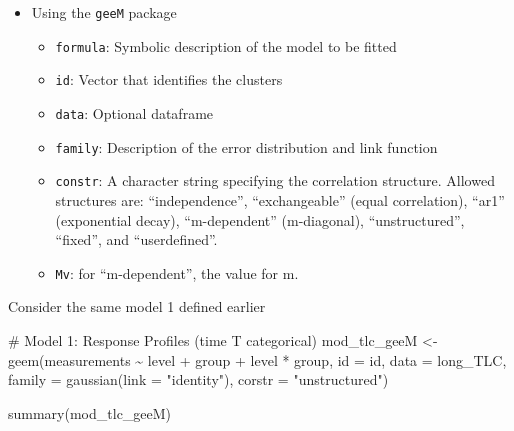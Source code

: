 \documentclass[
  letterpaper,
  DIV=11,
  numbers=noendperiod]{scrreprt}
\newenvironment{Shaded}{\begin{snugshade}}{\end{snugshade}}
\newcommand{\AttributeTok}[1]{\textcolor[rgb]{0.40,0.45,0.13}{#1}}
\newcommand{\CommentTok}[1]{\textcolor[rgb]{0.37,0.37,0.37}{#1}}
\newcommand{\FunctionTok}[1]{\textcolor[rgb]{0.28,0.35,0.67}{#1}}
\newcommand{\NormalTok}[1]{\textcolor[rgb]{0.00,0.23,0.31}{#1}}
\newcommand{\OtherTok}[1]{\textcolor[rgb]{0.00,0.23,0.31}{#1}}
\newcommand{\SpecialCharTok}[1]{\textcolor[rgb]{0.37,0.37,0.37}{#1}}
\newcommand{\StringTok}[1]{\textcolor[rgb]{0.13,0.47,0.30}{#1}}
\providecommand{\tightlist}{%
  \setlength{\itemsep}{0pt}\setlength{\parskip}{0pt}}\usepackage{longtable,booktabs,array}
\begin{document}
\begin{itemize}
\tightlist
\item
  Using the \texttt{geeM} package

  \begin{itemize}
  \tightlist
  \item
    \texttt{formula}: Symbolic description of the model to be fitted
  \item
    \texttt{id}: Vector that identifies the clusters
  \item
    \texttt{data}: Optional dataframe
  \item
    \texttt{family}: Description of the error distribution and link
    function
  \item
    \texttt{constr}: A character string specifying the correlation
    structure. Allowed structures are: ``independence'',
    ``exchangeable'' (equal correlation), ``ar1'' (exponential decay),
    ``m-dependent'' (m-diagonal), ``unstructured'', ``fixed'', and
    ``userdefined''.
  \item
    \texttt{Mv}: for ``m-dependent'', the value for m.
  \end{itemize}
\end{itemize}

Consider the same model 1 defined earlier

\begin{Shaded}
\begin{Highlighting}[]
\CommentTok{\# Model 1: Response Profiles (time T categorical)}
\NormalTok{mod\_tlc\_geeM }\OtherTok{\textless{}{-}} \FunctionTok{geem}\NormalTok{(measurements }\SpecialCharTok{\textasciitilde{}}\NormalTok{ level }\SpecialCharTok{+}\NormalTok{ group }\SpecialCharTok{+}\NormalTok{ level }\SpecialCharTok{*}\NormalTok{ group, }\AttributeTok{id =}\NormalTok{ id, }\AttributeTok{data =}\NormalTok{ long\_TLC,}
    \AttributeTok{family =} \FunctionTok{gaussian}\NormalTok{(}\AttributeTok{link =} \StringTok{"identity"}\NormalTok{), }\AttributeTok{corstr =} \StringTok{"unstructured"}\NormalTok{)}

\FunctionTok{summary}\NormalTok{(mod\_tlc\_geeM)}
\end{Highlighting}
\end{Shaded}
\end{document}
